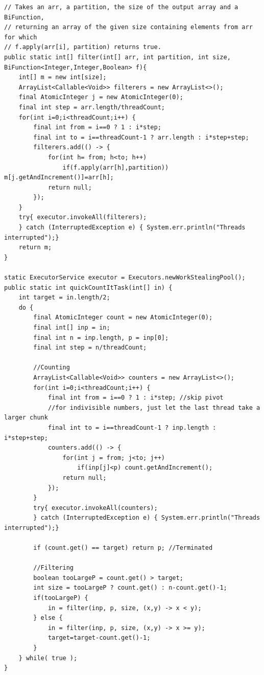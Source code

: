 \documentclass[a5paper]{article}
\begin{document}
\begin{lstlisting}
// Takes an arr, a partition, the size of the output array and a BiFunction,
// returning an array of the given size containing elements from arr for which 
// f.apply(arr[i], partition) returns true.
public static int[] filter(int[] arr, int partition, int size,  BiFunction<Integer,Integer,Boolean> f){
    int[] m = new int[size];
    ArrayList<Callable<Void>> filterers = new ArrayList<>();
    final AtomicInteger j = new AtomicInteger(0);
    final int step = arr.length/threadCount;
    for(int i=0;i<threadCount;i++) {
        final int from = i==0 ? 1 : i*step;
        final int to = i==threadCount-1 ? arr.length : i*step+step;
        filterers.add(() -> {
            for(int h= from; h<to; h++)
                if(f.apply(arr[h],partition)) m[j.getAndIncrement()]=arr[h];
            return null;
        });
    }
    try{ executor.invokeAll(filterers);
    } catch (InterruptedException e) { System.err.println("Threads interrupted");}
    return m;
}

static ExecutorService executor = Executors.newWorkStealingPool();
public static int quickCountItTask(int[] in) {
    int target = in.length/2;
    do {
        final AtomicInteger count = new AtomicInteger(0);
        final int[] inp = in;
        final int n = inp.length, p = inp[0];
        final int step = n/threadCount;

        //Counting
        ArrayList<Callable<Void>> counters = new ArrayList<>();
        for(int i=0;i<threadCount;i++) {
            final int from = i==0 ? 1 : i*step; //skip pivot
            //for indivisible numbers, just let the last thread take a larger chunk
            final int to = i==threadCount-1 ? inp.length : i*step+step;
            counters.add(() -> {
                for(int j = from; j<to; j++)
                    if(inp[j]<p) count.getAndIncrement(); 
                return null;
            });
        }
        try{ executor.invokeAll(counters);
        } catch (InterruptedException e) { System.err.println("Threads interrupted");}

        if (count.get() == target) return p; //Terminated

        //Filtering
        boolean tooLargeP = count.get() > target;
        int size = tooLargeP ? count.get() : n-count.get()-1;
        if(tooLargeP) {
            in = filter(inp, p, size, (x,y) -> x < y);
        } else {
            in = filter(inp, p, size, (x,y) -> x >= y);
            target=target-count.get()-1;
        }
    } while( true );
}
\end{lstlisting}
\end{document}
